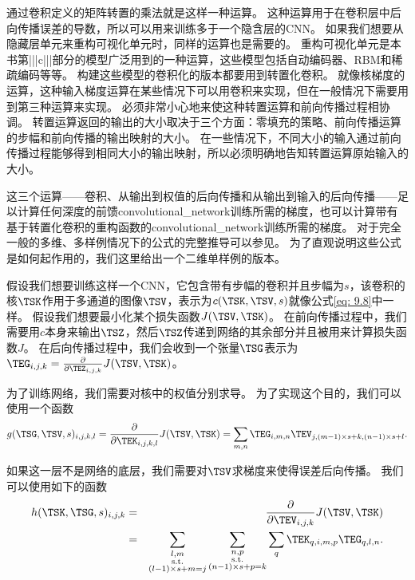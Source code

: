 通过卷积定义的矩阵转置的乘法就是这样一种运算。
这种运算用于在卷积层中后向传播误差的导数，所以可以用来训练多于一个隐含层的\gls{CNN}。
如果我们想要从隐藏层单元来重构可视化单元时，同样的运算也是需要的\citep{Simard92-short}。
重构可视化单元是本书第|||c|||部分的模型广泛用到的一种运算，这些模型包括自动编码器、RBM和稀疏编码等等。
构建这些模型的卷积化的版本都要用到转置化卷积。
就像核梯度的运算，这种输入梯度运算在某些情况下可以用卷积来实现，但在一般情况下需要用到第三种运算来实现。
必须非常小心地来使这种转置运算和前向传播过程相协调。
转置运算返回的输出的大小取决于三个方面：零填充的策略、前向传播运算的步幅和前向传播的输出映射的大小。
在一些情况下，不同大小的输入通过前向传播过程能够得到相同大小的输出映射，所以必须明确地告知转置运算原始输入的大小。

这三个运算——卷积、从输出到权值的后向传播和从输出到输入的后向传播——足以计算任何深度的前馈\gls{convolutional_network}训练所需的梯度，也可以计算带有基于转置化卷积的重构函数的\gls{convolutional_network}训练所需的梯度。
对于完全一般的多维、多样例情况下的公式的完整推导可以参见\cite{Goodfellow-TR2010}。 
为了直观说明这些公式是如何起作用的，我们这里给出一个二维单样例的版本。
 
 
假设我们想要训练这样一个\gls{CNN}，它包含带有步幅的卷积并且步幅为$s$，该卷积的核$\TSK$作用于多通道的图像$\TSV$，表示为$c(\TSK, \TSV, s)$就像公式\ref{eq: 9.8}中一样。
假设我们想要最小化某个损失函数$J(\TSV, \TSK)$。
在前向传播过程中，我们需要用$c$本身来输出$\TSZ$，然后$\TSZ$传递到网络的其余部分并且被用来计算损失函数$J$。
在后向传播过程中，我们会收到一个张量$\TSG$表示为$\TEG_{i, j, k} = \frac{\partial}{\partial \TEZ_{i, j, k}} J(\TSV, \TSK)$。

为了训练网络，我们需要对核中的权值分别求导。
为了实现这个目的，我们可以使用一个函数
\begin{equation}
g(\TSG, \TSV, s)_{i, j, k, l} = \frac{\partial}{\partial \TEK_{i, j, k, l}} J(\TSV, \TSK) = \sum_{m, n} \TEG_{i, m, n} \TEV_{j, (m-1)\times s+k, (n-1)\times s+l}.
\end{equation}

如果这一层不是网络的底层，我们需要对$\TSV$求梯度来使得误差后向传播。
我们可以使用如下的函数
\begin{eqnarray}
h(\TSK, \TSG, s)_{i, j, k} &=& \frac{\partial }{\partial \TEV_{i, j, k}} J(\TSV, \TSK)\\
&=& \sum_{\substack{l, m\\
                  \text{s.t.}\\
                  (l-1)\times s+m = j}} \sum_{\substack{n, p\\
                                                            \text{s.t.}\\
                                                            (n-1)\times s +p = k}}
            \sum_q \TEK_{q,i,m,p} \TEG_{q, l, n}.
\end{eqnarray}

